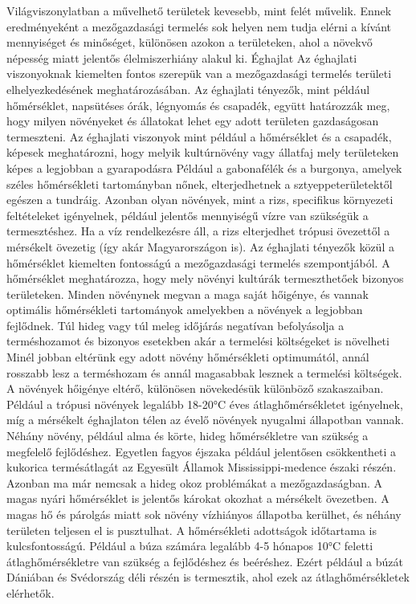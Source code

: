 \documentclass[a4paper,oneside,onecolumn,12pt]{LegrandOrangeBook}
\begin{document}
Világviszonylatban a művelhető területek kevesebb, mint felét művelik. Ennek eredményeként a mezőgazdasági termelés sok helyen nem tudja elérni a kívánt mennyiséget és minőséget, különösen azokon a területeken, ahol a növekvő népesség miatt jelentős élelmiszerhiány alakul ki.
Éghajlat
Az éghajlati viszonyoknak kiemelten fontos szerepük van a mezőgazdasági termelés területi elhelyezkedésének meghatározásában. Az éghajlati tényezők, mint például hőmérséklet, napsütéses órák, légnyomás és csapadék, együtt határozzák meg, hogy milyen növényeket és állatokat lehet egy adott területen gazdaságosan termeszteni. 
Az éghajlati viszonyok mint például a hőmérséklet és a csapadék, képesek meghatározni, hogy melyik kultúrnövény vagy állatfaj mely területeken képes a legjobban a gyarapodásra Például a gabonafélék és a burgonya, amelyek széles hőmérsékleti tartományban nőnek, elterjedhetnek a sztyeppeterületektől egészen a tundráig. Azonban olyan növények, mint a rizs, specifikus környezeti feltételeket igényelnek, például jelentős mennyiségű vízre van szükségük a termesztéshez. Ha a víz rendelkezésre áll, a rizs elterjedhet trópusi övezettől a mérsékelt övezetig (így akár Magyarországon is). 
Az éghajlati tényezők közül a hőmérséklet kiemelten fontosságú a mezőgazdasági termelés szempontjából. A hőmérséklet meghatározza, hogy mely növényi kultúrák termeszthetőek bizonyos területeken. Minden növénynek megvan a maga saját hőigénye, és vannak optimális hőmérsékleti tartományok amelyekben a növények a legjobban fejlődnek. Túl hideg vagy túl meleg időjárás negatívan befolyásolja a terméshozamot és bizonyos esetekben akár a termelési költségeket is növelheti
Minél jobban eltérünk egy adott növény hőmérsékleti optimumától, annál rosszabb lesz a terméshozam és annál magasabbak lesznek a termelési költségek.
A növények hőigénye eltérő, különösen növekedésük különböző szakaszaiban. Például a trópusi növények legalább 18-20°C éves átlaghőmérsékletet igényelnek, míg a mérsékelt éghajlaton télen az évelő növények nyugalmi állapotban vannak. Néhány növény, például alma és körte, hideg hőmérsékletre van szükség a megfelelő fejlődéshez. Egyetlen fagyos éjszaka például jelentősen csökkentheti a kukorica termésátlagát az Egyesült Államok Mississippi-medence északi részén.
Azonban ma már nemcsak a hideg okoz problémákat a mezőgazdaságban. A magas nyári hőmérséklet is jelentős károkat okozhat a mérsékelt övezetben. A magas hő és párolgás miatt sok növény vízhiányos állapotba kerülhet, és néhány területen teljesen el is pusztulhat. A hőmérsékleti adottságok időtartama is kulcsfontosságú. Például a búza számára legalább 4-5 hónapos 10°C feletti átlaghőmérsékletre van szükség a fejlődéshez és beéréshez. Ezért például a búzát Dániában és Svédország déli részén is termesztik, ahol ezek az átlaghőmérsékletek elérhetők. 
\end{document}
